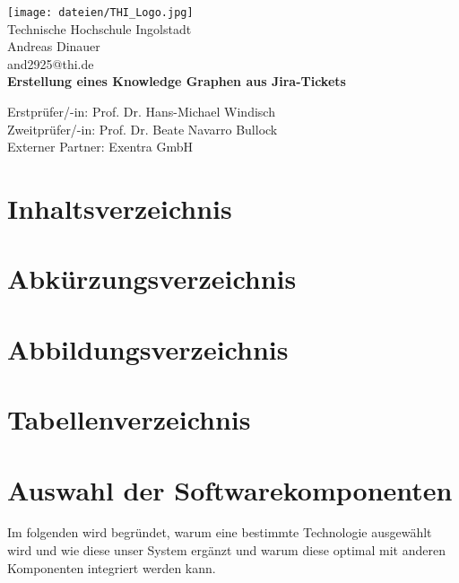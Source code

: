 \documentclass[10pt]{article}
\begin{document}
\renewcommand\thesection{\Roman{section}}
\begin{titlepage}
    \begin{center}
        \texttt{[image: dateien/THI\_Logo.jpg]} \\
        \vspace{0.5cm}
        Technische Hochschule Ingolstadt\\
        \vspace{1cm}
        \normalsize
        Andreas Dinauer\\
        and2925@thi.de\\
        
        \vspace*{0.5cm}
        \LARGE
        \textbf{Erstellung eines Knowledge Graphen aus Jira-Tickets}
            
        \vspace{1cm}
        \normalsize
        Erstprüfer/-in: Prof. Dr. Hans-Michael Windisch \\
        Zweitprüfer/-in: Prof. Dr. Beate Navarro Bullock \\
        \vspace{1cm}
        \normalsize
        Externer Partner: Exentra GmbH
            
    \end{center}
\end{titlepage}

\newpage

\section{Inhaltsverzeichnis}
\newpage
\section{Abkürzungsverzeichnis}
\newpage
\section{Abbildungsverzeichnis}
\newpage
\section{Tabellenverzeichnis}
\newpage
\setcounter{section}{0}
\renewcommand\thesection{\arabic{section}}


\section{Auswahl der Softwarekomponenten}
Im folgenden wird begründet, warum eine bestimmte Technologie ausgewählt wird und wie diese unser System ergänzt und warum diese optimal mit anderen Komponenten integriert werden kann.
\end{document}
